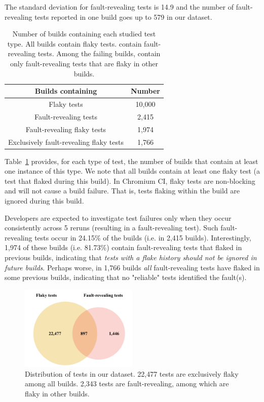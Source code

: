 The standard deviation for fault-revealing tests is 14.9 and the number of fault-revealing tests reported in one build goes up to 579 in our dataset.

\begin{table}[ht]
\caption{Number of builds containing each studied test type. All builds contain flaky tests.  contain fault-revealing tests. Among the failing builds,  contain only fault-revealing tests that are flaky in other builds.}
\label{table:DiscBuilds}
\centering
\begin{tabular}{c|c} 
 \toprule
 \textbf{Builds containing} & \textbf{Number} \\ [0.5ex] 
 \midrule
 Flaky tests & 10,000 \\ 
 Fault-revealing tests & 2,415 \\ 
 Fault-revealing flaky tests & 1,974 \\ 
 Exclusively fault-revealing flaky tests & 1,766 \\ 
 \bottomrule
\end{tabular}
\end{table}

Table~\ref{table:DiscBuilds} provides, for each type of test, the number of builds that contain at least one instance of this type. We note that all builds contain at least one flaky test (a test that flaked during this build). In Chromium CI, flaky tests are non-blocking and will not cause a build failure. That is, tests flaking within the build are ignored during this build. 

Developers are expected to investigate test failures only when they occur consistently across 5 reruns (resulting in a fault-revealing test). Such fault-revealing tests occur in 24.15\% of the builds (i.e. in 2,415 builds). Interestingly, 1,974 of these builds (i.e. 81.73\%) contain fault-revealing tests that flaked in previous builds, indicating that \emph{tests with a flake history should not be ignored in future builds}. Perhaps worse, in 1,766 builds \emph{all} fault-revealing tests have flaked in some previous builds, indicating that no "reliable" tests identified the fault(s).

\begin{figure}[ht]
\centering
\includegraphics[width=0.5\textwidth]{figures/chromium/venn.png}
\caption{Distribution of tests in our dataset. 22,477 tests are exclusively flaky among all builds. 2,343 tests are fault-revealing, among which  are flaky in other builds.}
\label{fig:venn}
\end{figure}

